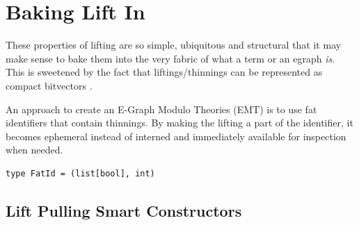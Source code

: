 \documentclass{article}%
\newcommand{\bR}{\mathbb{R}}
\newcommand{\lift}{\text{lift}}
\begin{document}







\section{Baking Lift In}

These properties of lifting are so simple, ubiquitous and structural that it may make sense to bake them into the very fabric of what a term or an egraph \emph{is}. This is sweetened by the fact that liftings/thinnings can be represented as compact bitvectors \cite{gonccalves2025thinning}.

An approach to create an E-Graph Modulo Theories (EMT) \cite{zucker2025omeletsneedonionsegraphs} is to use fat identifiers that contain thinnings. By making the lifting a part of the identifier, it becomes ephemeral instead of interned and immediately available for inspection when needed.

\begin{lstlisting}
type FatId = (list[bool], int)
\end{lstlisting}

\subsection{Lift Pulling Smart Constructors}
\end{document}
